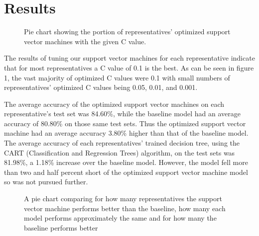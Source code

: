 \documentclass[11pt,letterpaper,twocolumn]{article}
\begin{document}
\section{Results}

\begin{figure}
\centering
{}
\caption{Pie chart showing the portion of representatives' optimized support vector machines with the given C value.}
\end{figure}

The results of tuning our support vector machines for each representative indicate that for most representatives a C value of 0.1 is the best. As can be seen in figure 1, the vast majority of optimized C values were 0.1 with small numbers of representatives' optimized C values being 0.05, 0.01, and 0.001.

The average accuracy of the optimized support vector machines on each representative's test set was 84.60\%, while the baseline model had an average accuracy of 80.80\% on those same test sets. Thus the optimized support vector machine had an average accuracy 3.80\% higher than that of the baseline model. The average accuracy of each representatives' trained decision tree, using the CART (Classification and Regression Trees) algorithm, on the test sets was 81.98\%, a 1.18\% increase over the baseline model. However, the model fell more than two and half percent short of the optimized support vector machine model so was not pursued further.

\begin{figure}
\centering
{}
\caption{A pie chart comparing for how many representatives the support vector machine performs better than the baseline, how many each model performs approximately the same and for how many the baseline performs better}
\end{figure}
\end{document}
